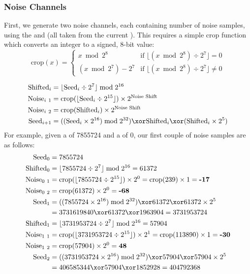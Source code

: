 \subsubsection{Noise Channels}

First, we generate two noise channels, each containing
 number of noise samples, using the
 and  (all taken from the
current ).
This requires a simple crop function which converts an integer
to a signed, 8-bit value:
\begin{equation*}
\text{crop}(x) =
\begin{cases}
x \bmod{2 ^ 8} & \text{if } \lfloor (x \bmod{2 ^ 8}) \div 2 ^ 7\rfloor = 0 \\
(x \bmod{2 ^ 7}) - 2 ^ 7 & \text{if } \lfloor (x \bmod{2 ^ 8}) \div 2 ^ 7\rfloor \neq 0
\end{cases}
\end{equation*}

\begin{align*}
\text{Shifted}_i &= \lfloor\text{Seed}_i \div 2 ^ 7\rfloor \bmod{2 ^ {16}} \\
\text{Noise}_{i~1} &= \text{crop}(\lfloor\text{Seed}_i \div 2 ^ {15}\rfloor) \times 2 ^ {\text{Noise Shift}} \\
\text{Noise}_{i~2} &= \text{crop}(\text{Shifted}_i) \times 2 ^ {\text{Noise Shift}} \\
\text{Seed}_{i + 1} &= ((\text{Seed}_i \times 2 ^ {16}) \bmod{2 ^ {32}}) \xor \text{Shifted}_i \xor (\text{Shifted}_i \times 2 ^ 5)
\end{align*}
For example, given a  of 7855724 and a
 of 0, our first couple of noise samples are
as follows:
\begin{align*}
\text{Seed}_0 &= 7855724 \\
\text{Shifted}_0 &= \lfloor 7855724 \div 2 ^ 7\rfloor \bmod{2 ^ {16}} = 61372 \\
\text{Noise}_{0~1} &= \text{crop}(\lfloor 7855724 \div 2 ^ {15}\rfloor) \times 2 ^ 0 = \text{crop}(239) \times 1 = \textbf{-17} \\
\text{Noise}_{0~2} &= \text{crop}(61372) \times 2 ^ 0 = \textbf{-68} \\
\text{Seed}_1 &= ((7855724 \times 2 ^ {16}) \bmod{2 ^ {32}}) \xor 61372 \xor 61372 \times 2 ^ 5 \\
&= 3731619840 \xor 61372 \xor 1963904 = 3731953724 \\
\text{Shifted}_1 &= \lfloor 3731953724 \div 2 ^ 7 \rfloor \bmod{2 ^ {16}} = 57904 \\
\text{Noise}_{1~1} &= \text{crop}(\lfloor 3731953724 \div 2 ^ {15}\rfloor) \times 2 ^ 1 = \text{crop}(113890) \times 1 = \textbf{-30} \\
\text{Noise}_{1~2} &= \text{crop}(57904) \times 2 ^ 0 = \textbf{48} \\
\text{Seed}_2 &= ((3731953724 \times 2 ^ {16}) \bmod{2 ^ {32}}) \xor 57904 \xor 57904 \times 2 ^ 5 \\
&= 406585344 \xor 57904 \xor 1852928 = 404792368
\end{align*}

